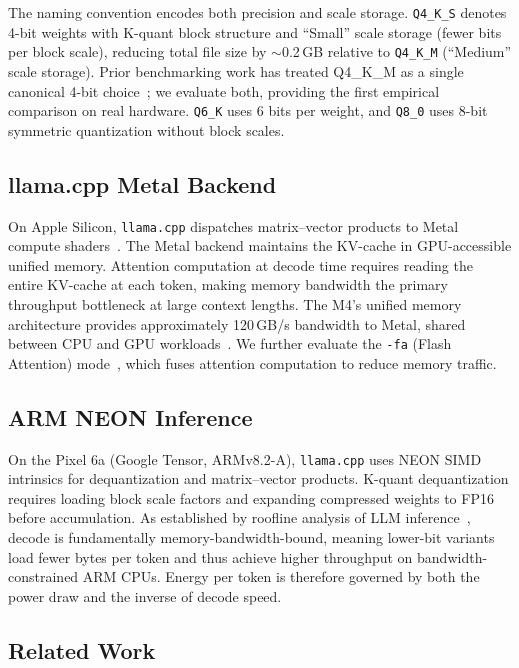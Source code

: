 \documentclass{article}
\begin{document}
The naming convention encodes both precision and scale storage. \texttt{Q4\_K\_S} denotes 4-bit weights with K-quant block structure and ``Small'' scale storage (fewer bits per block scale), reducing total file size by $\sim$0.2\,GB relative to \texttt{Q4\_K\_M} (``Medium'' scale storage). Prior benchmarking work has treated Q4\_K\_M as a single canonical 4-bit choice~\cite{llmqbench}; we evaluate both, providing the first empirical comparison on real hardware. \texttt{Q6\_K} uses 6 bits per weight, and \texttt{Q8\_0} uses 8-bit symmetric quantization without block scales.

\subsection{llama.cpp Metal Backend}

On Apple Silicon, \texttt{llama.cpp} dispatches matrix--vector products to Metal compute shaders~\cite{llamacpp}. The Metal backend maintains the KV-cache in GPU-accessible unified memory. Attention computation at decode time requires reading the entire KV-cache at each token, making memory bandwidth the primary throughput bottleneck at large context lengths. The M4's unified memory architecture provides approximately 120\,GB/s bandwidth to Metal, shared between CPU and GPU workloads~\cite{applem4}. We further evaluate the \texttt{-fa} (Flash Attention) mode~\cite{flashattention2}, which fuses attention computation to reduce memory traffic.

\subsection{ARM NEON Inference}

On the Pixel 6a (Google Tensor, ARMv8.2-A), \texttt{llama.cpp} uses NEON SIMD intrinsics for dequantization and matrix--vector products. K-quant dequantization requires loading block scale factors and expanding compressed weights to FP16 before accumulation. As established by roofline analysis of LLM inference~\cite{llminference}, decode is fundamentally memory-bandwidth-bound, meaning lower-bit variants load fewer bytes per token and thus achieve higher throughput on bandwidth-constrained ARM CPUs. Energy per token is therefore governed by both the power draw and the inverse of decode speed.

\subsection{Related Work}
\end{document}
